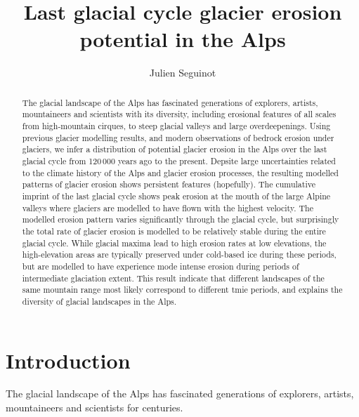 \documentclass[utf8]{article}
\title{Last glacial cycle glacier erosion potential in the Alps}
\author{Julien Seguinot}
\affil{Anafi, Greece}
\begin{document}

\maketitle

\begin{abstract}

    The glacial landscape of the Alps has fascinated generations of explorers,
    artists, mountaineers and scientists with its diversity, including
    erosional features of all scales from high-mountain cirques, to steep
    glacial valleys and large overdeepenings. Using previous glacier modelling
    results, and modern observations of bedrock erosion under glaciers, we
    infer a distribution of potential glacier erosion in the Alps over the last
    glacial cycle from 120\,000 years ago to the present.
    Depsite large uncertainties related to the climate history of the Alps and
    glacier erosion processes, the resulting modelled patterns of glacier
    erosion shows persistent features (hopefully). The cumulative imprint of
    the last glacial cycle shows peak erosion at the mouth of the large Alpine
    valleys where glaciers are modelled to have flown with the highest
    velocity. The modelled erosion pattern varies significantly through the
    glacial cycle, but surprisingly the total rate of glacier erosion is
    modelled to be relatively stable during the entire glacial cycle.  While
    glacial maxima lead to high erosion rates at low elevations, the
    high-elevation areas are typically preserved under cold-based ice during
    these periods, but are modelled to have experience mode intense erosion
    during periods of intermediate glaciation extent.
    This result indicate that different landscapes of the same mountain range
    most likely correspond to different tmie periods, and explains the
    diversity of glacial landscapes in the Alps.

\end{abstract}

\section{Introduction}

    The glacial landscape of the Alps has fascinated generations of explorers,
    artists, mountaineers and scientists for centuries.
\end{document}
